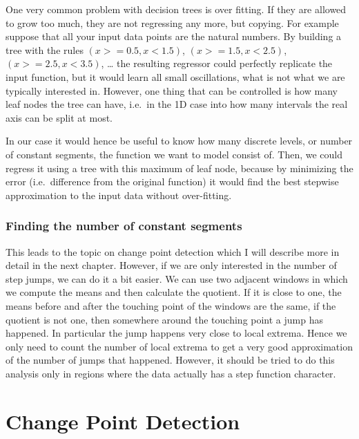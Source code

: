 \documentclass[12pt,a4paper]{article}
\begin{document}
One very common problem with decision trees is over fitting. If they are allowed to grow too much, they are not regressing any more, but copying. For example suppose that all your input data points are the natural numbers. By building a tree with the rules \((x >= 0.5, x <1.5)\), \((x >= 1.5, x <2.5)\), \((x >= 2.5, x <3.5)\), \ldots{} the resulting regressor could perfectly replicate the input function, but it would learn all small oscillations, what is not what we are typically interested in. However, one thing that can be controlled is how many leaf nodes the tree can have, i.e.~in the 1D case into how many intervals the real axis can be split at most.

In our case it would hence be useful to know how many discrete levels, or number of constant segments, the function we want to model consist of. Then, we could regress it using a tree with this maximum of leaf node, because by minimizing the error (i.e.~difference from the original function) it would find the best stepwise approximation to the input data without over-fitting.

\hypertarget{finding-the-number-of-constant-segments}{%
\subsubsection{Finding the number of constant
segments}\label{finding-the-number-of-constant-segments}}

This leads to the topic on change point detection which I will describe more in detail in the next chapter. However, if we are only interested in the number of step jumps, we can do it a bit easier. We can use two adjacent windows in which we compute the means and then calculate the quotient. If it is close to one, the means before and after the touching point of the windows are the same, if the quotient is not one, then somewhere around the touching point a jump has happened. In particular the jump happens very close to local extrema. Hence we only need to count the number of local extrema to get a very good approximation of the number of jumps that happened. However, it should be tried to do this analysis only in regions where the data actually has a step function character.

\hypertarget{change-point-detection}{%
\section{Change Point Detection}\label{change-point-detection}}
\end{document}

